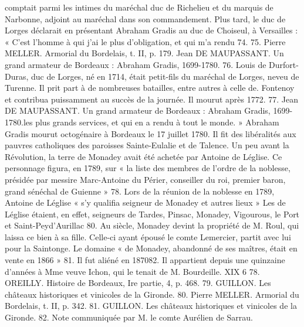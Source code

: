 comptait parmi les intimes du maréchal duc de Richelieu et du marquis de Narbonne, adjoint au maréchal dans son commandement. Plus tard, le duc de Lorges déclarait en présentant Abraham Gradis au duc de Choiseul, à Versailles : « C'est l'homme à qui j'ai le plus d'obligation, et qui m'a rendu 74. 75. Pierre MELLER. Armorial du Bordelais, t. II, p. 179. Jean DE MAUPASSANT. Un grand armateur de Bordeaux : Abraham Gradis, 1699-1780. 76. Louis de Durfort-Duras, duc de Lorges, né en 1714, était petit-fils du maréchal de Lorges, neveu de Turenne. Il prit part à de nombreuses batailles, entre autres à celle de. Fontenoy et contribua puissamment au succès de la journée. Il mourut après 1772. 77. Jean DE MAUPASSANT. Un grand armateur de Bordeaux : Abraham Gradis, 1699-1780.les plus grands services, et qui en a rendu à tout le monde. » Abraham Gradis mourut octogénaire à Bordeaux le 17 juillet 1780. Il fit des libéralités aux pauvres catholiques des paroisses Sainte-Eulalie et de Talence. Un peu avant la Révolution, la terre de Monadey avait été achetée par Antoine de Léglise. Ce personnage figura, en 1789, sur « la liste des membres de l'ordre de la noblesse, présidée par messire Marc-Antoine du Périer, conseiller du roi, premier baron, grand sénéchal de Guienne » 78. Lors de la réunion de la noblesse en 1789, Antoine de Léglise « s'y qualifia seigneur de Monadey et autres lieux » Les de Léglise étaient, en effet, seigneurs de Tardes, Pinsac, Monadey, Vigourous, le Port et Saint-Peyd'Aurillac 80. Au siècle, Monadey devint la propriété de M. Roul, qui laissa ce bien à sa fille. Celle-ci ayant épousé le comte Lemercier, partit avec lui pour la Saintonge. Le domaine « de Monadey, abandonné de ses maîtres, était en vente en 1866 » 81. Il fut aliéné en 187082. Il appartient depuis une quinzaine d'années à Mme veuve Ichon, qui le tenait de M. Bourdeille. XIX 6 78. OREILLY. Histoire de Bordeaux, Ire partie, 4, p. 468. 79. GUILLON. Les châteaux historiques et vinicoles de la Gironde. 80. Pierre MELLER. Armorial du Bordelais, t. II, p. 342. 81. GUILLON. Les châteaux historiques et vinicoles de la Gironde. 82. Note communiquée par M. le comte Aurélien de Sarrau.
